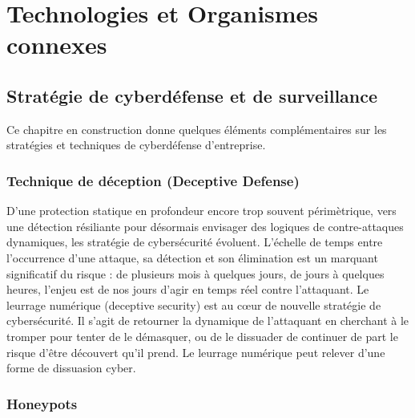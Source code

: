 
\section{Technologies et Organismes connexes}

\subsection{Stratégie de cyberdéfense et de surveillance}

Ce chapitre en construction donne quelques éléments complémentaires sur les stratégies et techniques de cyberdéfense d'entreprise. 


\subsubsection{Technique de déception (Deceptive Defense)}

 D'une protection statique en profondeur encore trop souvent périmètrique, vers une détection résiliante pour désormais envisager des logiques de contre-attaques dynamiques, les stratégie de cybersécurité évoluent. L'échelle de temps entre l'occurrence d'une attaque, sa détection et son élimination est un marquant significatif du risque : de plusieurs mois à quelques jours,  de jours à quelques heures, l'enjeu est  de nos jours  d'agir en temps réel contre l'attaquant. 
 Le leurrage numérique (deceptive security) est au cœur de nouvelle stratégie de  cybersécurité. Il s'agit de retourner la dynamique  de l'attaquant en cherchant à le tromper pour tenter de le démasquer, ou de le dissuader de continuer de part le risque d'être découvert qu'il prend. Le leurrage numérique peut relever d'une forme de dissuasion cyber.

\subsubsection{Honeypots}

